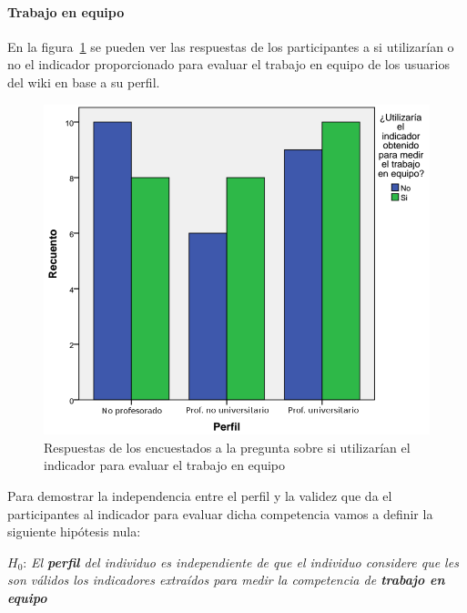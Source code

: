 \paragraph*{Trabajo en equipo}

En la figura~\ref{fig:app:barras:perfil:equipo} se pueden ver las respuestas de los participantes a si utilizarían o no el indicador proporcionado para evaluar el trabajo en equipo de los usuarios del wiki en base a su perfil.

\begin{figure}
  \begin{center}
    \includegraphics[scale=0.3]{barras_perfil_equipo.png}
  \end{center}
  \caption{Respuestas de los encuestados a la pregunta sobre si utilizarían el indicador para evaluar el trabajo en equipo}
  \label{fig:app:barras:perfil:equipo}
\end{figure}

Para demostrar la independencia entre el perfil y la validez que da el participantes al indicador para evaluar dicha competencia vamos a definir la siguiente hipótesis nula:

\begin{mdframed}[style=hipotesis0]
$H_0$: \emph{El \textbf{perfil} del individuo es independiente de que el individuo considere que les son válidos los indicadores extraídos para medir la competencia de \textbf{trabajo en equipo}}
\end{mdframed}

